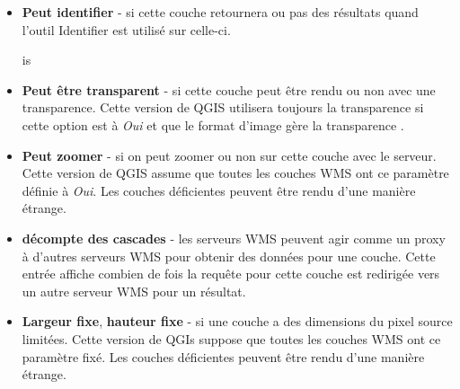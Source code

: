 \begin{itemize}
\begin{itemize}
\item \textbf{Peut identifier}     - si cette couche retournera ou pas des
r\'esultats quand l'outil Identifier est utilis\'e sur celle-ci.

is
\item \textbf{Peut \^etre transparent} - si cette couche peut \^etre rendu ou
non avec une transparence. Cette version de QGIS utilisera toujours la
transparence si cette option est \`a \textsl{Oui} et que le format d'image g\`ere
la transparence
                                    .

\item \textbf{Peut zoomer}      - si on peut zoomer ou non sur cette couche
avec le serveur. Cette version de QGIS assume que toutes les couches WMS ont ce
param\`etre d\'efinie \`a \textsl{Oui}. Les couches d\'eficientes peuvent \^etre rendu
d'une mani\`ere \'etrange.

\item \textbf{d\'ecompte des cascades}    - les serveurs WMS peuvent agir comme
un proxy \`a d'autres serveurs WMS pour obtenir des donn\'ees pour une couche.
Cette entr\'ee affiche combien de fois la requ\^ete pour cette couche est
redirig\'ee vers un autre serveur WMS pour un r\'esultat.

\item \textbf{Largeur fixe}, \textbf{hauteur fixe}     - si une couche a
des dimensions du pixel source limit\'ees. Cette version de QGIs suppose que
toutes les couches WMS ont ce param\`etre fix\'e. Les couches d\'eficientes  peuvent
\^etre rendu d'une mani\`ere \'etrange.


\end{itemize}
\end{itemize}

